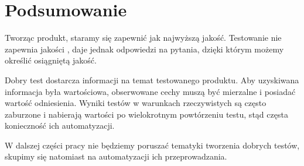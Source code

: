 \documentclass[00-praca-magisterska.tex]{subfiles}
\begin{document}
\section{Podsumowanie}
\label{testowanie-podsumowanie}

Tworząc produkt, staramy się zapewnić jak najwyższą jakość. Testowanie nie
zapewnia jakości \cite{good-test}, daje jednak odpowiedzi na pytania, dzięki
którym możemy określić osiągniętą jakość.

Dobry test dostarcza informacji na temat testowanego produktu. Aby uzyskiwana
informacja była wartościowa, obserwowane cechy muszą być mierzalne i posiadać
wartość odniesienia.  Wyniki testów w warunkach rzeczywistych są często
zaburzone i nabierają wartości po wielokrotnym powtórzeniu testu, stąd częsta
konieczność ich automatyzacji.

W dalszej części pracy nie będziemy poruszać tematyki tworzenia dobrych testów,
skupimy się natomiast na automatyzacji ich przeprowadzania.
\end{document}

